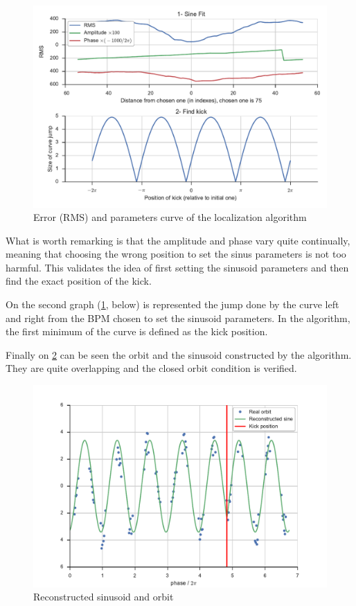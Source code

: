 \begin{figure}
    \centering
    \includegraphics[width=\linewidth]{img/loc_errorplots}
    \caption{\label{fig:loc_errorplots} Error (RMS) and parameters curve of the localization algorithm}
\end{figure}

What is worth remarking is that the amplitude and phase vary quite continually, meaning that choosing the wrong position to set the sinus parameters is not too harmful. This validates the idea of first setting the sinusoid parameters and then find the exact position of the kick.

On the second graph (\cref{fig:loc_errorplots}, below) is represented the jump done by the curve left and right from the BPM chosen to set the sinusoid parameters. In the algorithm, the first minimum of the curve is defined as the kick position.

Finally on \cref{fig:loc_reconstructed_sine} can be seen the orbit and the sinusoid constructed by the algorithm. They are quite overlapping and the closed orbit condition is verified.

\begin{figure}
    \centering
    \includegraphics[width=\linewidth]{img/loc_reconstructed_sine}
    \caption{\label{fig:loc_reconstructed_sine} Reconstructed sinusoid and orbit}
\end{figure}

